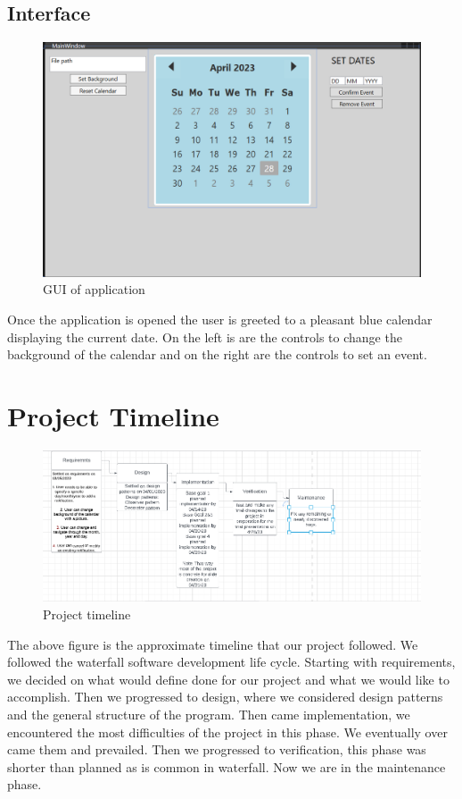 \documentclass[10pt,conference,onecolumn,compsoc]{IEEEtran}
\begin{document}
\subsection{Interface}
\begin{figure} [ht!]
\includegraphics[scale=0.6]{gui.png}
\caption{GUI of application}
\label{GUI}
\end{figure}

Once the application is opened the user is greeted to a pleasant blue calendar displaying the current date. On the left is are the controls to change the background of the calendar and on the right are the controls to set an event.

\section{Project Timeline}
\begin{figure} [ht!]
\includegraphics[scale=0.65]{Roadmap.png}
\caption{Project timeline}
\label{timeline}
\end{figure}

The above figure is the approximate timeline that our project followed. We followed the waterfall software development life cycle. Starting with requirements, we decided on what would define done for our project and what we would like to accomplish. Then we progressed to design, where we considered design patterns and the general structure of the program. Then came implementation, we encountered the most difficulties of the project in this phase. We eventually over came them and prevailed. Then we progressed to verification, this phase was shorter than planned as is common in waterfall. Now we are in the maintenance phase.
\end{document}
